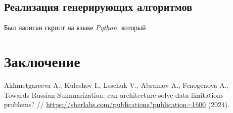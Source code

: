\documentclass[12pt, a4paper]{article}
\begin{document}
    \subsection{Реализация генерирующих алгоритмов}

    Был написан скрипт на языке \textit{Python}, который  
    \begin{results}
       
	\end{results}

	\section*{Заключение}

    \begin{thebibliography}{5}
        Akhmetgareeva A., Kuleshov I., Leschuk V., Abramov A., Fenogenova A., Towards Russian Summarization: can architecture solve data limitations problems? // \url{https://sberlabs.com/publications?publication=1600} (2024).

    \end{thebibliography}
	    
\end{document}
